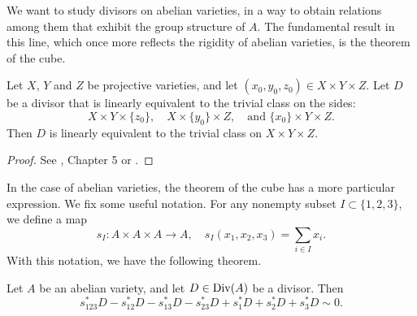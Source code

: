 We want to study divisors on abelian varieties, in a way to obtain relations among them that exhibit the group structure of $A$. The fundamental result in this line, which once more reflects the rigidity of abelian varieties, is the theorem of the cube.

\begin{theorem}\label{thmcube}
	Let $X$, $Y$ and $Z$ be projective varieties, and let $(x_0,y_0,z_0)\in X\times Y\times Z$. Let $D$ be a divisor that is linearly equivalent to the trivial class on the sides:
	\begin{equation*}
		X\times Y\times\{z_0\},\quad X\times\{y_0\}\times Z,\quad\text{and } \{x_0\}\times Y\times Z.
	\end{equation*}
	Then $D$ is linearly equivalent to the trivial class on $X\times Y\times Z$.
\end{theorem}
\begin{proof}
	See \cite{Cornell_Silverman_Artin_1986}, Chapter 5 or \cite{Mumford_1970}.
\end{proof}
In the case of abelian varieties, the theorem of the cube has a more particular expression. We fix some useful notation. For any nonempty subset $I\subset\{1,2,3\}$, we define a map
\begin{equation*}
	s_I:A\times A\times A\rightarrow A,\quad s_I(x_1,x_2,x_3)=\sum_{i\in I}x_i.
\end{equation*}
With this notation, we have the following theorem.
\begin{theorem}\label{thmcubeabelian}
	Let $A$ be an abelian variety, and let $D\in\operatorname{Div}(A)$ be a divisor. Then
	\begin{equation*}
		s_{123}^*D-s_{12}^*D-s_{13}^*D-s_{23}^*D+s_1^*D+s_2^*D+s_3^*D\sim 0.
	\end{equation*}
\end{theorem}
